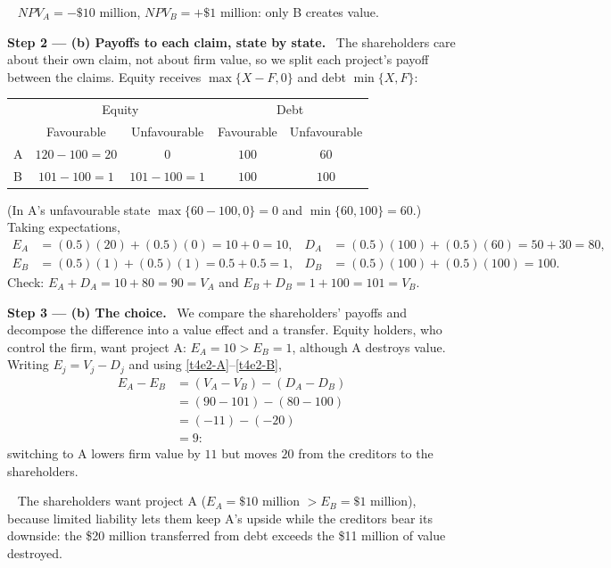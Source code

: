 \documentclass[11pt,a4paper]{article}
\newcommand{\step}[2]{\par\medskip\noindent\textbf{Step #1 --- #2.}~}
\newcommand{\answer}[1]{\par\smallskip\noindent\fbox{\textbf{Answer #1.}}~}
\begin{document}
\answer{(a)} $\mathit{NPV}_A=-\$10$ million, $\mathit{NPV}_B=+\$1$ million: only B creates value.

\step{2}{(b) Payoffs to each claim, state by state} The shareholders care about their own claim,
not about firm value, so we split each project's payoff between the claims. Equity receives
$\max\{X-F,0\}$ and debt $\min\{X,F\}$:
\begin{center}
\begin{tabular}{lcccc}
\toprule
 & \multicolumn{2}{c}{Equity} & \multicolumn{2}{c}{Debt}\\
 & Favourable & Unfavourable & Favourable & Unfavourable\\
\midrule
A & $120-100=20$ & $0$ & $100$ & $60$\\
B & $101-100=1$ & $101-100=1$ & $100$ & $100$\\
\bottomrule
\end{tabular}
\end{center}
(In A's unfavourable state $\max\{60-100,0\}=0$ and $\min\{60,100\}=60$.) Taking expectations,
\begin{align}
  E_A &= (0.5)(20)+(0.5)(0) = 10+0 = 10, & D_A &= (0.5)(100)+(0.5)(60) = 50+30 = 80, \label{t4e2-A}\\
  E_B &= (0.5)(1)+(0.5)(1) = 0.5+0.5 = 1, & D_B &= (0.5)(100)+(0.5)(100) = 100. \label{t4e2-B}
\end{align}
Check: $E_A+D_A=10+80=90=V_A$ and $E_B+D_B=1+100=101=V_B$.

\step{3}{(b) The choice} We compare the shareholders' payoffs and decompose the difference into a
value effect and a transfer. Equity holders, who control the firm, want project A: $E_A=10>E_B=1$,
although A destroys value. Writing $E_j=V_j-D_j$ and using \eqref{t4e2-A}--\eqref{t4e2-B},
\begin{align}
  E_A-E_B &= (V_A-V_B)-(D_A-D_B) \label{t4e2-split}\\
          &= (90-101)-(80-100) \nonumber\\
          &= (-11)-(-20) \nonumber\\
          &= 9: \nonumber
\end{align}
switching to A lowers firm value by $11$ but moves $20$ from the creditors to the shareholders.

\answer{(b)} The shareholders want project A ($E_A=\$10$ million $>E_B=\$1$ million), because
limited liability lets them keep A's upside while the creditors bear its downside: the \$20 million
transferred from debt exceeds the \$11 million of value destroyed.
\end{document}
